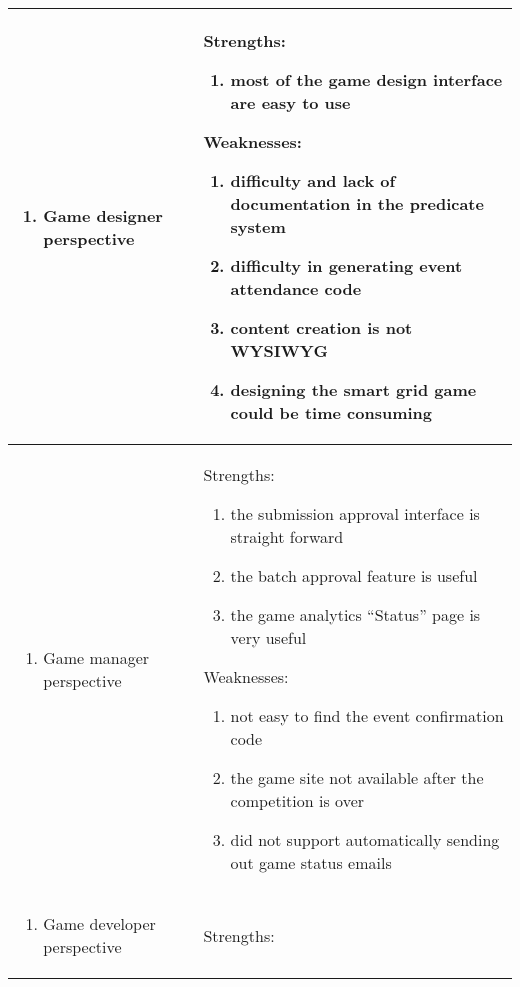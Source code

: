 \begin{table}[ht!]
\begin{tabular}{|P{0.15\columnwidth}|P{0.78\columnwidth}|}
    \hline
    \begin{enumerate}[label={}, nosep, leftmargin=*]
    \item Game designer perspective
    \end{enumerate}
    & 
    Strengths:
    \begin{enumerate}[label={}, nosep, leftmargin=*]
    \item most of the game design interface are easy to use 
    \end{enumerate} 
    Weaknesses:
    \begin{enumerate}[nosep, leftmargin=*]
    \item difficulty and lack of documentation in the predicate system 
    \item difficulty in generating event attendance code
    \item content creation is not WYSIWYG
    \item designing the smart grid game could be time consuming
    \end{enumerate} \\
    \hline
    \begin{enumerate}[label={}, nosep, leftmargin=*]
    \item Game manager perspective 
    \end{enumerate}
    & 
    Strengths:
    \begin{enumerate}[nosep, leftmargin=*]
    \item the submission approval interface is straight forward 
    \item the batch approval feature is useful 
    \item the game analytics ``Status'' page is very useful
    \end{enumerate} 
    Weaknesses:
    \begin{enumerate}[nosep, leftmargin=*]
    \item not easy to find the event confirmation code 
    \item the game site not available after the competition is over
    \item did not support automatically sending out game status emails 
    \end{enumerate}  \\
    \hline
    \begin{enumerate}[label={}, nosep, leftmargin=*]
    \item Game developer perspective
    \end{enumerate}
    & 
    Strengths:
    \begin{enumerate}[label={}, nosep, leftmargin=*]

\end{enumerate}
\end{tabular}
\end{table}
